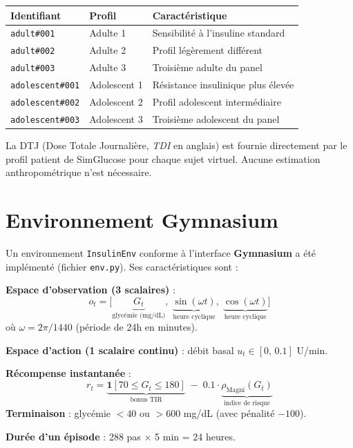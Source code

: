 \documentclass[a4paper,12pt]{report}
\begin{document}
\begin{center}
\begin{tabular}{lll}
\toprule
\textbf{Identifiant} & \textbf{Profil} & \textbf{Caractéristique} \\
\midrule
\texttt{adult\#001} & Adulte 1 & Sensibilité à l'insuline standard \\
\texttt{adult\#002} & Adulte 2 & Profil légèrement différent \\
\texttt{adult\#003} & Adulte 3 & Troisième adulte du panel \\
\texttt{adolescent\#001} & Adolescent 1 & Résistance insulinique plus élevée \\
\texttt{adolescent\#002} & Adolescent 2 & Profil adolescent intermédiaire \\
\texttt{adolescent\#003} & Adolescent 3 & Troisième adolescent du panel \\
\bottomrule
\end{tabular}
\end{center}

La DTJ (Dose Totale Journalière, \textit{TDI} en anglais) est fournie directement par le profil patient de SimGlucose pour chaque sujet virtuel. Aucune estimation anthropométrique n'est nécessaire.

\section{Environnement Gymnasium}

Un environnement \texttt{InsulinEnv} conforme à l'interface \textbf{Gymnasium} a été implémenté (fichier \texttt{env.py}). Ses caractéristiques sont :

\begin{tcolorbox}[mybox, title=Spécification de l'environnement]
\textbf{Espace d'observation (3 scalaires)} :
\[ o_t = \bigl[\underbrace{G_t}_{\text{glycémie (mg/dL)}},\; \underbrace{\sin(\omega t)}_{\text{heure cyclique}},\; \underbrace{\cos(\omega t)}_{\text{heure cyclique}}\bigr] \]
où $\omega = 2\pi / 1440$ (période de 24h en minutes).

\medskip
\textbf{Espace d'action (1 scalaire continu)} : débit basal $u_t \in [0,\, 0.1]$ U/min.

\medskip
\textbf{Récompense instantanée} :
\[
  r_t = \underbrace{\mathbf{1}[70 \le G_t \le 180]}_{\text{bonus TIR}} \;-\; 0.1 \cdot \underbrace{\rho_{\text{Magni}}(G_t)}_{\text{indice de risque}}
\]
\textbf{Terminaison} : glycémie $< 40$ ou $> 600$ mg/dL (avec pénalité $-100$).

\medskip
\textbf{Durée d'un épisode} : 288 pas $\times$ 5 min = 24 heures.
\end{tcolorbox}
\end{document}
